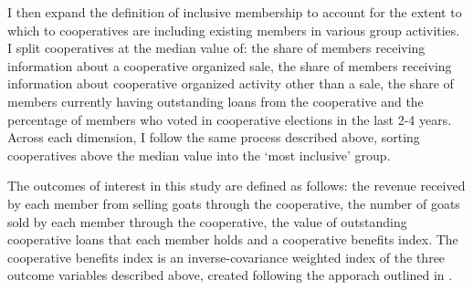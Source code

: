 \documentclass[11pt]{article}
\begin{document}
I then expand the definition of inclusive membership to account for the extent to which to cooperatives are including existing members in various group activities. I split cooperatives at the median value of: the share of members receiving information about a cooperative organized sale, the share of members receiving information about cooperative organized activity other than a sale, the share of members currently having outstanding loans from the cooperative and the percentage of members who voted in cooperative elections in the last 2-4 years. Across each dimension, I follow the same process described above, sorting cooperatives above the median value into the `most inclusive' group.

The outcomes of interest in this study are defined as follows: the revenue received by each member from selling goats through the cooperative, the number of goats sold by each member through the cooperative, the value of outstanding cooperative loans that each member holds and a cooperative benefits index. The cooperative benefits index is an inverse-covariance weighted index of the three outcome variables described above, created following the apporach outlined in \citet{anderson_multiple_2008}.
\end{document}

